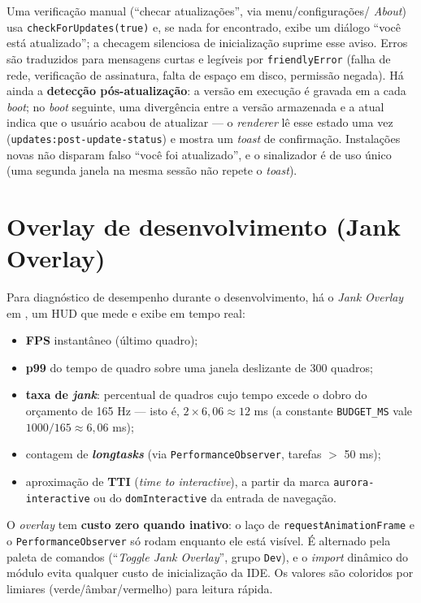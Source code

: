 Uma verificação manual (\enquote{checar atualizações}, via menu/configurações/
\textit{About}) usa \lstinline|checkForUpdates(true)| e, se nada for encontrado,
exibe um diálogo \enquote{você está atualizado}; a checagem silenciosa de
inicialização suprime esse aviso. Erros são traduzidos para mensagens curtas e
legíveis por \lstinline|friendlyError| (falha de rede, verificação de
assinatura, falta de espaço em disco, permissão negada). Há ainda a
\textbf{detecção pós-atualização}: a versão em execução é gravada em
 a cada \textit{boot}; no \textit{boot}
seguinte, uma divergência entre a versão armazenada e a atual indica que o
usuário acabou de atualizar — o \textit{renderer} lê esse estado uma vez
(\lstinline|updates:post-update-status|) e mostra um \textit{toast} de
confirmação. Instalações novas não disparam falso \enquote{você foi
atualizado}, e o sinalizador é de uso único (uma segunda janela na mesma sessão
não repete o \textit{toast}).

\section{Overlay de desenvolvimento (Jank Overlay)}
\label{sec:13-jank}

Para diagnóstico de desempenho durante o desenvolvimento, há o \textit{Jank
Overlay} em , um HUD que mede e exibe em tempo
real:

\begin{itemize}[leftmargin=*]
  \item \textbf{FPS} instantâneo (último quadro);
  \item \textbf{p99} do tempo de quadro sobre uma janela deslizante de 300
        quadros;
  \item \textbf{taxa de \textit{jank}}: percentual de quadros cujo tempo excede
        o dobro do orçamento de 165 Hz --- isto é, $2 \times 6{,}06 \approx
        12$ ms (a constante \lstinline|BUDGET_MS| vale $1000/165 \approx 6{,}06$ ms);
  \item contagem de \textbf{\textit{longtasks}} (via \lstinline|PerformanceObserver|,
        tarefas $>$ 50 ms);
  \item aproximação de \textbf{TTI} (\textit{time to interactive}), a partir da
        marca \lstinline|aurora-interactive| ou do \lstinline|domInteractive| da
        entrada de navegação.
\end{itemize}

O \textit{overlay} tem \textbf{custo zero quando inativo}: o laço de
\lstinline|requestAnimationFrame| e o \lstinline|PerformanceObserver| só rodam
enquanto ele está visível. É alternado pela paleta de comandos
(\enquote{\textit{Toggle Jank Overlay}}, grupo \lstinline|Dev|), e o
\textit{import} dinâmico do módulo evita qualquer custo de inicialização da IDE.
Os valores são coloridos por limiares (verde/âmbar/vermelho) para leitura
rápida.

